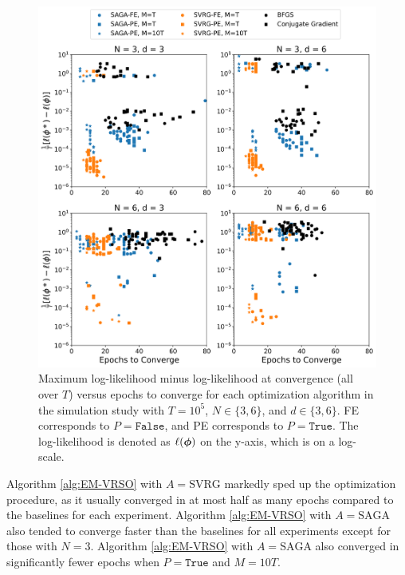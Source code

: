 \begin{figure}%
    \centering
    \includegraphics[width=5.5in]{../plt/scatter_sim_T_100000.png}
    \caption{Maximum log-likelihood minus log-likelihood at convergence (all over $T$) versus epochs to converge for each optimization algorithm in the simulation study with $T=10^{5}$, $N \in \{3,6\}$, and $d \in \{3,6\}$. FE corresponds to $P = \texttt{False}$, and PE corresponds to $P = \texttt{True}$.
    The log-likelihood is denoted as $\ell(\boldsymbol{\phi})$ on the y-axis, which is on a log-scale.}
    \label{fig:scatter_sim}
\end{figure}
%
Algorithm \ref{alg:EM-VRSO} with $A=\text{SVRG}$ markedly sped up the optimization procedure, as it usually converged in at most half as many epochs compared to the baselines for each experiment. Algorithm \ref{alg:EM-VRSO} with $A=\text{SAGA}$ also tended to converge faster than the baselines for all experiments except for those with $N=3$. Algorithm \ref{alg:EM-VRSO} with $A=\text{SAGA}$ also converged in significantly fewer epochs when $P = \texttt{True}$ and $M=10T$. 
